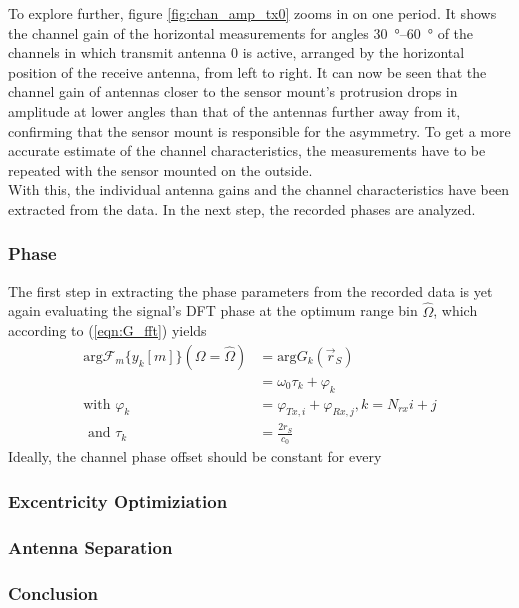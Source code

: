 To explore further, figure \ref{fig:chan_amp_tx0} zooms in on one period.
It shows the channel gain of the horizontal measurements for angles \SIrange{30}{60}{\degree}
of the channels in which transmit antenna 0 is active, arranged by the horizontal position of the receive antenna, from left to right.
It can now be seen that the channel gain of antennas closer to the sensor mount's protrusion drops
in amplitude at lower angles than that of the antennas further away from it,
confirming that the sensor mount is responsible for the asymmetry.
To get a more accurate estimate of the channel characteristics,
the measurements have to be repeated with the sensor mounted on the outside.\\

With this, the individual antenna gains and the channel characteristics have been extracted from the data.
In the next step, the recorded phases are analyzed.

\subsubsection*{Phase}
The first step in extracting the phase parameters from the recorded data is yet again
evaluating the signal's DFT phase at the optimum range bin $\hat \Omega$,
which according to (\ref{eqn:G_fft}) yields
\begin{align}
    \text{arg} \mathcal{F}_m\{y_k[m]\}(\Omega = \hat \Omega) & =    \text{arg}G_k(\vec r_S)                  \\
                                                             & = \omega_0\tau_k + \varphi_k                  \\
    \text{with } \varphi_k                                   & = \varphi_{Tx,i}+\varphi_{Rx,j},  k=N_{rx}i+j \\
    \text{ and } \tau_k                                      & = \frac{2r_S}{c_0}
\end{align}
Ideally, the channel phase offset should be constant for every


\subsubsection*{Excentricity Optimiziation}

\subsubsection*{Antenna Separation}

\subsubsection*{Conclusion}
